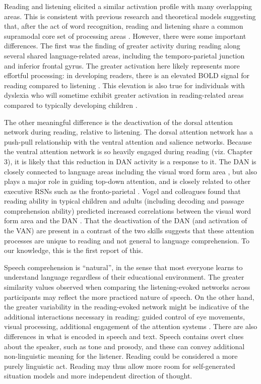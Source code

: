 Reading and listening elicited a similar activation profile with many overlapping areas. This is consistent with previous research and theoretical models suggesting that, after the act of word recognition, reading and listening share a common supramodal core set of processing areas \citep{Rueckl2015, Hoover1990, Price2012}. However, there were some important differences. The first was the finding of greater activity during reading along several shared language-related areas, including the temporo-parietal junction and inferior frontal gyrus. The greater activation here likely represents more effortful processing: in developing readers, there is an elevated BOLD signal for reading compared to listening \citep{Berl2011}. This elevation is also true for individuals with dyslexia who will sometime exhibit greater activation in reading-related areas compared to typically developing children \citep{Pugh2000}. 

The other meaningful difference is the deactivation of the dorsal attention network during reading, relative to listening. The dorsal attention network has a push-pull relationship with the ventral attention and salience networks. Because the ventral attention network is so heavily engaged during reading (viz. Chapter 3), it is likely that this reduction in DAN activity is a response to it. The DAN is closely connected to language areas including the visual word form area \citep{Bouhali2014}, but also plays a major role in guiding top-down attention, and is closely related to other executive RSNs such as the fronto-parietal \citep{Vogel2014}. Vogel and colleagues found that reading ability in typical children and adults (including decoding and passage comprehension ability) predicted increased correlations between the visual word form area and the DAN \citep{Vogel2012a}. That the deactivation of the DAN (and activation of the VAN) are present in a contrast of the two skills suggests that these attention processes are unique to reading and not general to language comprehension. To our knowledge, this is the first report of this.


Speech comprehension is ``natural'', in the sense that most everyone learns to understand language regardless of their educational environment. The greater similarity values observed when comparing the listening-evoked networks across participants may reflect the more practiced nature of speech. On the other hand, the greater variability in the reading-evoked network might be indicative of the additional interactions necessary in reading: guided control of eye movements, visual processing, additional engagement of the attention systems \citep{Mattingly1971}. There are also differences in what is encoded in speech and text.  Speech contains overt clues about the speaker, such as tone and prosody, and these can convey additional non-linguistic meaning for the listener. Reading could be considered a more purely linguistic act. Reading may thus allow more room for self-generated situation models and more independent direction of thought. 

